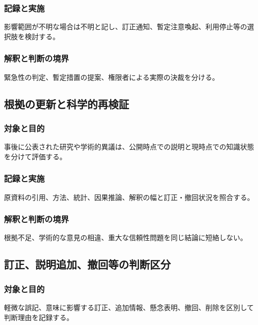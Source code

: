 \documentclass[a4paper,11pt]{article}
\begin{document}
\subsubsection{記録と実施}
\par 影響範囲が不明な場合は不明と記し、訂正通知、暫定注意喚起、利用停止等の選択肢を検討する。\par\medskip
\subsubsection{解釈と判断の境界}
\par 緊急性の判定、暫定措置の提案、権限者による実際の決裁を分ける。\par\medskip
\subsection{根拠の更新と科学的再検証}
\subsubsection{対象と目的}
\par 事後に公表された研究や学術的異議は、公開時点での説明と現時点での知識状態を分けて評価する。\par\medskip
\subsubsection{記録と実施}
\par 原資料の引用、方法、統計、因果推論、解釈の幅と訂正・撤回状況を照合する。\par\medskip
\subsubsection{解釈と判断の境界}
\par 根拠不足、学術的な意見の相違、重大な信頼性問題を同じ結論に短絡しない。\par\medskip
\subsection{訂正、説明追加、撤回等の判断区分}
\subsubsection{対象と目的}
\par 軽微な誤記、意味に影響する訂正、追加情報、懸念表明、撤回、削除を区別して判断理由を記録する。\par\medskip
\end{document}
